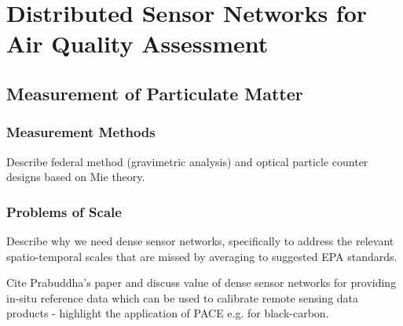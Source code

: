\chapter{Distributed Sensor Networks for Air Quality Assessment}\label{ch:air-network}

\section{Measurement of Particulate Matter}

\subsection{Measurement Methods}

Describe federal method (gravimetric analysis) and optical particle counter
designs based on Mie theory.

\subsection{Problems of Scale}

Describe why we need dense sensor networks, specifically to address the relevant
spatio-temporal scales that are missed by averaging to suggested EPA standards.

Cite Prabuddha's paper and discuss value of dense sensor networks for providing
in-situ reference data which can be used to calibrate remote sensing data
products - highlight the application of PACE e.g. for black-carbon.







